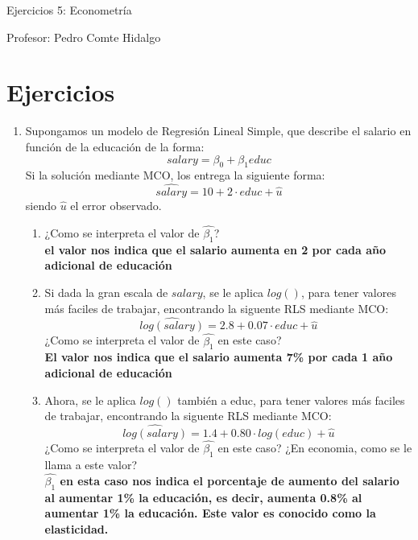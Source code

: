 \documentclass[10pt,a4paper]{article}
\begin{document}
\vspace{5cm}

\begin{center}
    {\Large  Ejercicios 5: Econometría }

Profesor:    Pedro Comte Hidalgo
\end{center}



\section{Ejercicios}
\begin{enumerate}
    \item Supongamos un modelo de Regresión Lineal Simple, que describe el salario en función de la educación de la forma:
    $$salary = \beta_0 + \beta_1 educ$$
    Si la solución mediante MCO, los entrega la siguiente forma:
        $$\hat{salary} = 10 + 2\cdot educ + \hat{u}$$
    siendo $\hat{u}$ el error observado.
    \begin{enumerate}
        \item  ¿Como se interpreta el valor de $\hat{\beta_1}$?  \\
        \textbf{el valor nos indica que el salario aumenta en 2 por cada año adicional de educación}

        \item Si dada la gran escala de $salary$, se le aplica $log()$, para tener valores más faciles de trabajar, encontrando la siguente RLS mediante MCO:
        $$\hat{log({salary})} = 2.8 + 0.07\cdot educ + \hat{u}$$
        ¿Como se interpreta el valor de $\hat{\beta_1}$ en este caso?  \\
        \textbf{El valor nos indica que el salario aumenta 7\% por cada 1 año adicional de educación}
        \item Ahora, se le aplica $log()$ también a educ, para tener valores más faciles de trabajar, encontrando la siguente RLS mediante MCO:
        $$\hat{log({salary})} = 1.4 + 0.80\cdot log(educ) + \hat{u}$$
        ¿Como se interpreta el valor de $\hat{\beta_1}$ en este caso? ¿En economia, como se le llama a este valor?\\
        \textbf{$\hat{\beta_1}$ en esta caso nos indica el porcentaje de aumento del salario al aumentar 1\% la educación, es decir, aumenta 0.8\% al aumentar 1\% la educación. Este valor es conocido como la elasticidad.}
    \end{enumerate}



\end{enumerate}
\end{document}
